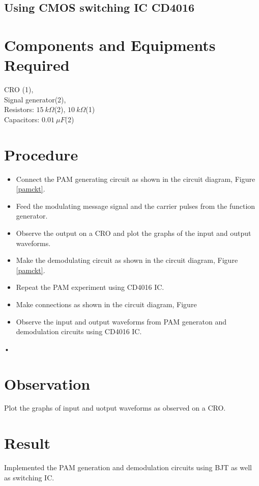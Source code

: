 \subsection*{Using CMOS switching IC CD4016}
\section*{Components and Equipments Required}
CRO (1), \\Signal generator(2),
\\Resistors: $15\ k\Omega$(2), $10\ k\Omega$(1)
\\Capacitors: $0.01\  \mu F$(2)
\section*{Procedure}
\begin{itemize}
\item
Connect the PAM generating circuit as shown in the circuit diagram, Figure \ref{pamckt}.
\item
Feed the modulating message signal and the carrier pulses from the function generator.
\item
Observe the output on a CRO and plot the graphs of the input and output waveforms.
\item
Make the demodulating circuit as shown in the circuit diagram, Figure \ref{pamckt}.
\item
Repeat the PAM experiment using CD4016 IC.
\item
Make connections as shown in the circuit diagram, Figure %
\item
Observe the input and output waveforms from PAM generaton and demodulation circuits using CD4016 IC.

\end{itemize}•
\section*{Observation}
Plot the graphs of input and uotput waveforms as observed on a CRO.
\section*{Result}

Implemented the PAM generation and demodulation circuits using BJT as well as switching IC.